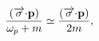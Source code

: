 \begin{equation}
\frac{(\overrightarrow{\sigma }\mathbf{\cdot p})}{\omega _{p}+m}\simeq \frac{%
(\overrightarrow{\sigma }\mathbf{\cdot p})}{2m},
\end{equation}

